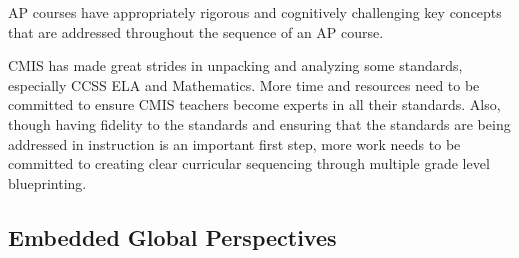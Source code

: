 \documentclass{report}
\begin{document}
\begin{findings}
AP courses have appropriately rigorous and cognitively challenging key concepts that are addressed throughout the sequence of an AP course.  


CMIS has made great strides in unpacking and analyzing some standards, especially CCSS ELA  and Mathematics. More time and resources need to be committed to ensure CMIS teachers become experts in all their standards. Also, though having fidelity to the standards and ensuring that the standards are being addressed in instruction is an important first step, more work needs to be committed to creating clear curricular sequencing through multiple grade level blueprinting. 
\end{findings}

\subsection{Embedded Global Perspectives}


\end{document}
